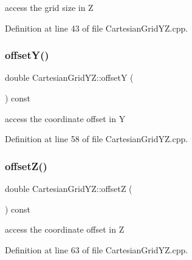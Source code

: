 access the grid size in Z 



Definition at line 43 of file Cartesian\+Grid\+Y\+Z.\+cpp.

\hypertarget{class_d_d4hep_1_1_geometry_1_1_cartesian_grid_y_z_a60d3f414130a8ceca2e4dd937d74eaf8}{}\label{class_d_d4hep_1_1_geometry_1_1_cartesian_grid_y_z_a60d3f414130a8ceca2e4dd937d74eaf8} 
\subsubsection{\texorpdfstring{offset\+Y()}{offsetY()}}
{\footnotesize\ttfamily double Cartesian\+Grid\+Y\+Z\+::offsetY (\begin{DoxyParamCaption}{ }\end{DoxyParamCaption}) const}



access the coordinate offset in Y 



Definition at line 58 of file Cartesian\+Grid\+Y\+Z.\+cpp.

\hypertarget{class_d_d4hep_1_1_geometry_1_1_cartesian_grid_y_z_a6d938eec80202b43db2d0073308a5ec5}{}\label{class_d_d4hep_1_1_geometry_1_1_cartesian_grid_y_z_a6d938eec80202b43db2d0073308a5ec5} 
\subsubsection{\texorpdfstring{offset\+Z()}{offsetZ()}}
{\footnotesize\ttfamily double Cartesian\+Grid\+Y\+Z\+::offsetZ (\begin{DoxyParamCaption}{ }\end{DoxyParamCaption}) const}



access the coordinate offset in Z 



Definition at line 63 of file Cartesian\+Grid\+Y\+Z.\+cpp.

\hypertarget{class_d_d4hep_1_1_geometry_1_1_cartesian_grid_y_z_a5292ec43a2410e91d6b65003189833cf}{}\label{class_d_d4hep_1_1_geometry_1_1_cartesian_grid_y_z_a5292ec43a2410e91d6b65003189833cf} 
